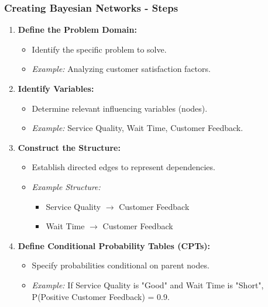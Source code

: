 \documentclass[aspectratio=169]{beamer}
\begin{document}
\begin{frame}[fragile]
    \frametitle{Creating Bayesian Networks - Steps}
    \begin{enumerate}
        \item \textbf{Define the Problem Domain:}
            \begin{itemize}
                \item Identify the specific problem to solve.
                \item \textit{Example:} Analyzing customer satisfaction factors.
            \end{itemize}
        \item \textbf{Identify Variables:}
            \begin{itemize}
                \item Determine relevant influencing variables (nodes).
                \item \textit{Example:} Service Quality, Wait Time, Customer Feedback.
            \end{itemize}
        \item \textbf{Construct the Structure:}
            \begin{itemize}
                \item Establish directed edges to represent dependencies.
                \item \textit{Example Structure:}
                \begin{itemize}
                    \item Service Quality $\rightarrow$ Customer Feedback
                    \item Wait Time $\rightarrow$ Customer Feedback
                \end{itemize}
            \end{itemize}
        \item \textbf{Define Conditional Probability Tables (CPTs):}
            \begin{itemize}
                \item Specify probabilities conditional on parent nodes.
                \item \textit{Example:} If Service Quality is "Good" and Wait Time is "Short", P(Positive Customer Feedback) = 0.9.
            \end{itemize}
    \end{enumerate}
\end{frame}
\end{document}
